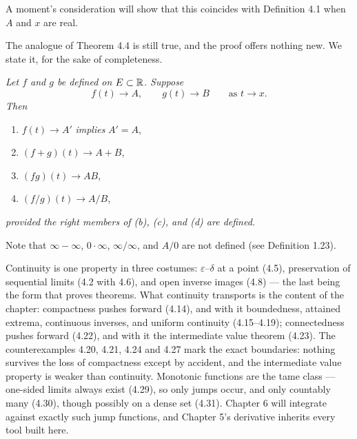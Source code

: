 A moment's consideration will show that this coincides with Definition 4.1
when $A$ and $x$ are real.

The analogue of Theorem 4.4 is still true, and the proof offers nothing new.
We state it, for the sake of completeness.

\emph{Let $f$ and $g$ be defined on $E \subset \mathbb{R}$. Suppose}
\[ f(t) \to A, \qquad g(t) \to B \qquad\text{as } t \to x. \]
\emph{Then}
\begin{enumerate}[label=(\alph*), leftmargin=2.2em, itemsep=1pt, topsep=3pt]
  \item $f(t) \to A'$ \emph{implies} $A' = A$,
  \item $(f+g)(t) \to A+B$,
  \item $(fg)(t) \to AB$,
  \item $(f/g)(t) \to A/B$,
\end{enumerate}
\emph{provided the right members of (b), (c), and (d) are defined.}

Note that $\infty-\infty$, $0\cdot\infty$, $\infty/\infty$, and $A/0$ are not
defined (see Definition 1.23).

\begin{recap}
Continuity is one property in three costumes: $\varepsilon$--$\delta$ at a
point (4.5), preservation of sequential limits (4.2 with 4.6), and open
inverse images (4.8) --- the last being the form that proves theorems. What
continuity transports is the content of the chapter: compactness pushes
forward (4.14), and with it boundedness, attained extrema, continuous
inverses, and uniform continuity (4.15--4.19); connectedness pushes forward
(4.22), and with it the intermediate value theorem (4.23). The
counterexamples 4.20, 4.21, 4.24 and 4.27 mark the exact boundaries: nothing
survives the loss of compactness except by accident, and the intermediate
value property is weaker than continuity. Monotonic functions are the tame
class --- one-sided limits always exist (4.29), so only jumps occur, and only
countably many (4.30), though possibly on a dense set (4.31). Chapter 6 will
integrate against exactly such jump functions, and Chapter 5's derivative
inherits every tool built here.
\end{recap}
